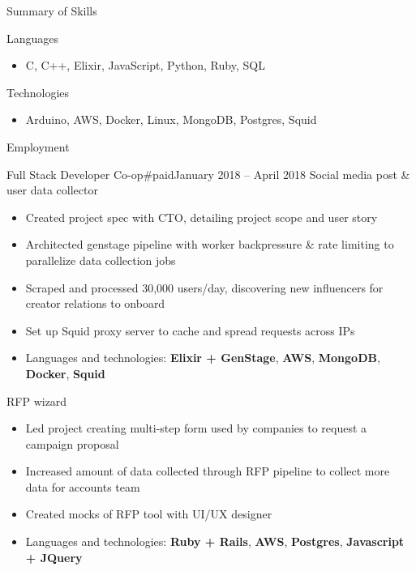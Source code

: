 \documentclass[calibri]{mcdowellcv}
\begin{document}
    \makeheader

    \begin{cvsection}{\Large{Summary of Skills}}
        \begin{cvsubsection}{Languages}{}{}
            \begin{itemize}
                \item C, C++, Elixir, JavaScript, Python, Ruby, SQL
            \end{itemize}
        \end{cvsubsection}

        \begin{cvsubsection}{Technologies}{}{}
            \begin{itemize}
                \item Arduino, AWS, Docker, Linux, MongoDB, Postgres, Squid
            \end{itemize}
        \end{cvsubsection}
    \end{cvsection}

    \begin{cvsection}{\Large{Employment}}
        \begin{cvsubsection}{Full Stack Developer Co-op}{\#paid}{January 2018 -- April 2018}
            Social media post \& user data collector
            \begin{itemize}
                \item Created project spec with CTO, detailing project scope and user story
                \item Architected genstage pipeline with worker backpressure \& rate limiting to parallelize data collection jobs
                \item Scraped and processed 30,000 users/day, discovering new influencers for creator relations to onboard
                \item Set up Squid proxy server to cache and spread requests across IPs
                \item Languages and technologies: \textbf{Elixir + GenStage}, \textbf{AWS}, \textbf{MongoDB}, \textbf{Docker}, \textbf{Squid}
            \end{itemize}

            RFP wizard
            \begin{itemize}
                \item Led project creating multi-step form used by companies to request a campaign proposal
                \item Increased amount of data collected through RFP pipeline to collect more data for accounts team
                \item Created mocks of RFP tool with UI/UX designer
                \item Languages and technologies: \textbf{Ruby + Rails}, \textbf{AWS}, \textbf{Postgres}, \textbf{Javascript + JQuery}
            \end{itemize}
        \end{cvsubsection}
    \end{cvsection}
\end{document}
